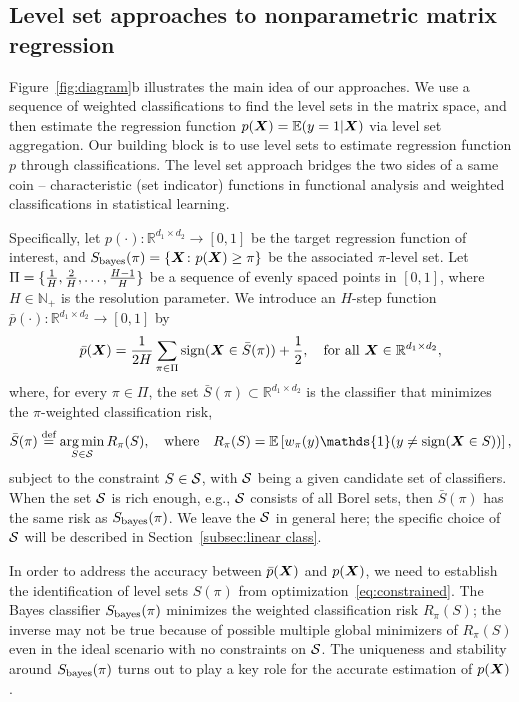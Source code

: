 \documentclass[11pt]{article}
\theoremstyle{plain}
\theoremstyle{definition}
\def\sign{\textup{sign}}
\def\bayesS{S_{\textup{bayes}}}
\begin{document}
\subsection{Level set approaches to nonparametric matrix regression}\label{sec:bridge}
Figure~\ref{fig:diagram}b illustrates the main idea of our approaches. We use a sequence of weighted classifications to find the level sets in the matrix space, and then estimate the regression function $p(\bm X)=\mathbb{E}(y=1|\bm X)$ via level set aggregation. Our building block is to use level sets to estimate regression function $p$ through classifications. The level set approach bridges the two sides of a same coin -- characteristic (set indicator) functions in functional analysis and weighted classifications in statistical learning. 

Specifically, let $p(\cdot)\colon \mathbb{R}^{d_1\times d_2}\to [0,1]$ be the target regression function of interest, and $\bayesS(\pi)=\{\mX\colon p(\mX)\geq \pi\}$ be the associated $\pi$-level set. Let $\Pi=\{{1\over H}, {2\over H}, \ldots, {H-1\over H} \}$ be a sequence of evenly spaced points in $[0,1]$, where $H\in\mathbb{N}_{+}$ is the resolution parameter. We introduce an $H$-step function $\bar p(\cdot)\colon \mathbb{R}^{d_1\times d_2} \to [0,1]$ by
\begin{equation}\label{eq:stepfunction}
\bar p(\mX)= {1\over 2H}  \sum_{\pi \in \Pi} \sign (\mX\in \bar S(\pi))+{1\over 2}, \quad \text{for all }\mX\in\mathbb{R}^{d_1\times d_2},
\end{equation}
where, for every $\pi\in\Pi$, the set $\bar S(\pi)\subset \mathbb{R}^{d_1\times d_2}$ is the classifier that minimizes the $\pi$-weighted classification risk,
\begin{equation}\label{eq:constrained}
\bar S(\pi) \stackrel{\text{def}}{=} \argmin_{S\in \tS}R_\pi(S), \quad \text{where}\quad R_\pi(S)=\mathbb{E}\left[ w_{\pi}(y)\mathds{1}(y\neq \sign (\mX\in S))\right],
\end{equation}
subject to the constraint $S\in\mathcal{S}$, with $\mathcal{S}$ being a given candidate set of classifiers. When the set $\mathcal{S}$ is rich enough, e.g., $\mathcal{S}$ consists of all Borel sets, then $\bar S(\pi)$ has the same risk as $\bayesS(\pi)$. We leave the $\mathcal{S}$ in general here; the specific choice of $\mathcal{S}$ will be described in Section~\ref{subsec:linear class}. 

In order to address the accuracy between $\bar p(\bm X)$ and $p(\bm X)$, we need to establish the identification of level sets $S(\pi)$ from optimization~\eqref{eq:constrained}. The Bayes classifier $\bayesS(\pi)$ minimizes the weighted classification risk $R_\pi(S)$; the inverse may not be true because of possible multiple global minimizers of $R_\pi(S)$ even in the ideal scenario with no constraints on $\mathcal{S}$. The uniqueness and stability around $\bayesS(\pi)$ turns out to play a key role for the accurate estimation of $p(\bm X)$. 
\end{document}
